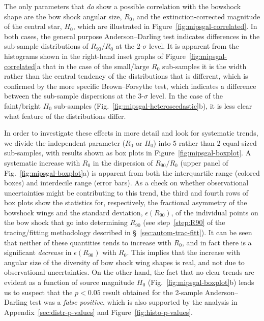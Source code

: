 The only parameters that \emph{do} show a possible correlation with
the bowshock shape are the bow shock angular size, \(R_0\), and the
extinction-corrected magnitude of the central star, \(H_0\), which are
illustrated in Figure~\ref{fig:mipsgal-correlated}.  In both cases,
the general purpose Anderson--Darling test indicates differences in the
sub-sample distributions of \(R_{90} / R_0\) at the 2-\(\sigma\) level.  It
is apparent from the histograms shown in the right-hand inset graphs
of Figure~\ref{fig:mipsgal-correlated}a that in the case of the
small/large \(R_0\) sub-samples it is the width rather than the
central tendency of the distributions that is different, which is
confirmed by the more specific Brown--Forsythe test, which indicates a
difference between the sub-sample dispersions at the 3-\(\sigma\) level.
In the case of the faint/bright \(H_0\) sub-samples
(Fig.~\ref{fig:mipsgal-heteroscedastic}b), it is less clear what
feature of the distributions differ.

In order to investigate these effects in more detail and look for
systematic trends, we divide the independent parameter (\(R_0\) or
\(H_0\)) into 5 rather than 2 equal-sized sub-samples, with results
shown as box plots in Figure~\ref{fig:mipsgal-boxplot}.  A systematic
increase with \(R_0\) in the dispersion of \(R_{90}/R_0\) (upper panel
of Fig.~\ref{fig:mipsgal-boxplot}a) is apparent from both the
interquartile range (colored boxes) and interdecile range (error
bars).  As a check on whether observational uncertainties might be
contributing to this trend, the third and fourth rows of box plots
show the statistics for, respectively, the fractional asymmetry of the
bowshock wings and the standard deviation, \(\epsilon(R_{90})\), of the
individual points on the bow shock that go into determining \(R_{90}\)
(see step~\ref{step:R90} of the tracing/fitting methodology described
in \S~\ref{sec:autom-trac-fitt}).  It can be seen that neither of
these quantities tends to increase with \(R_0\), and in fact there is
a significant \emph{decrease} in \(\epsilon(R_{90})\) with \(R_0\).  This
implies that the increase with angular size of the diversity of bow
shock wing shapes is real, and not due to observational uncertainties.  
On the other hand, the fact that no clear trends are evident as a
function of source magnitude \(H_0\) (Fig.~\ref{fig:mipsgal-boxplot}b)
leads us to suspect that the \(p < 0.05\) result obtained for the
2-sample Anderson--Darling test was a \emph{false positive}, which is
also supported by the analysis in Appendix~\ref{sec:distr-p-values}
and Figure~\ref{fig:histo-p-values}.

